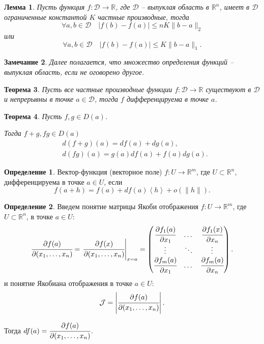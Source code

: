 \documentclass[oneside, final]{book}
\newcommand{\mbb}[1]{\mathbb{#1}}
\newcommand{\mcl}[1]{\mathcal{#1}}
\theoremstyle{plain}
\newtheorem{theorem}{Теорема}[chapter]
\newtheorem{lemma}[theorem]{Лемма}
\newtheorem{remark}[theorem]{Замечание}
\theoremstyle{definition}
\newtheorem{mdef}{Определение}[chapter]
\begin{document}
	\begin{lemma}
		Пусть функция $f\colon \mcl D \to \mbb R$, где $\mcl D$ -- выпуклая область в $\mbb R^n$, имеет в $\mcl D$ ограниченные константой $K$ частные производные, тогда 
		$$
			\forall a, b\in \mcl D \quad |f(b)-f(a)|\le n K \|b-a\|_2
		$$
		или 
		$$
			\forall a,b \in \mcl D \quad |f(b)-f(a)|\le K \|b-a\|_1.
		$$
	\end{lemma}

	\begin{remark}
		Далее полагается, что множество определения функций -- выпуклая область, если не оговорено другое.
	\end{remark}

	\begin{theorem}
		Пусть все частные производные функции $f\colon \mcl D \to \mbb R$ существуют в $\mcl D$ и непрерывны в точке $a\in\mcl D$, тогда $f$ дифференцируема в точке $a$.
	\end{theorem}

	\begin{theorem}
		Пусть $f, g \in D(a)$. 
		
		Тогда $f+g, fg \in D(a)$ 
		\begin{align*}
			&d(f+g)(a) = df(a)+dg(a),\\
			&d(fg)(a)=g(a)df(a)+f(a)dg(a).
		\end{align*}
	\end{theorem}
	
	\begin{mdef}
		Вектор-функция (векторное поле) $f\colon U \to \mbb R^m$, где $U \subset \mbb R^n$, дифференцируема в точке $a\in U$, если 	
		$$
			f(a+h)=f(a)+df(a)\left< h\right> +o(\|h\|).
		$$
	\end{mdef}

	\begin{mdef}
		Введем понятие матрицы Якоби отображения $f\colon U \to \mbb R^m$, где $U \subset \mbb R^n$, в точке $a\in U$:
		$$
			\cfrac {\partial f(a)} {\partial(x_1, \ldots, x_n)} = \left. \cfrac {\partial f(x)} {\partial(x_1, \ldots, x_n)} \right|_{x=a} = \begin{pmatrix}
				\cfrac {\partial f_1(a)} {\partial x_1} & \dots & \cfrac {\partial f_1(x)} {\partial x_n} \\
				\vdots & \ddots & \vdots \\
				\cfrac {\partial f_m(a)} {\partial x _1} & \dots & \cfrac {\partial f_m(a)} {\partial x_n}
			\end{pmatrix}.
		$$
		и понятие Якобиана отображения в точке $a \in U$:
		$$
			\mcl J = \left|  \cfrac {\partial f(a)} {\partial(x_1, \ldots, x_n)}  \right|.
		$$
	
		Тогда $df(a) = \cfrac {\partial f(a)} {\partial(x_1, \ldots, x_n)}$.
	\end{mdef}
	
\end{document}
